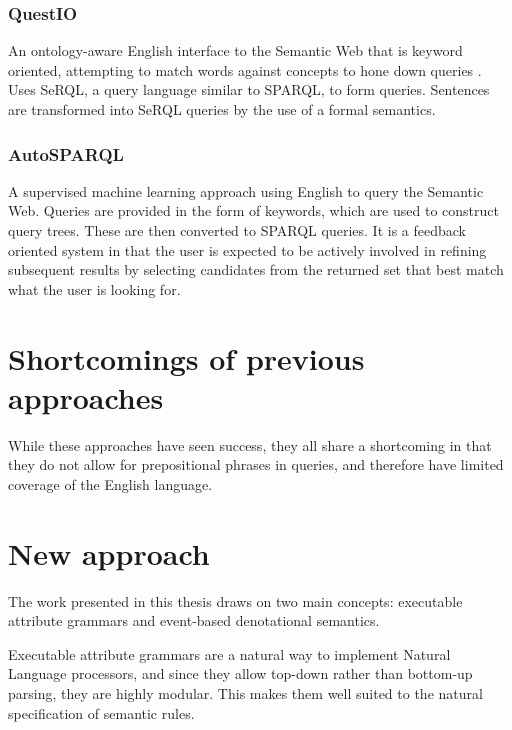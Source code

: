 \documentclass[../main.tex]{subfiles}
\begin{document}
\subsubsection{QuestIO}
An ontology-aware English interface to the Semantic Web that is keyword oriented, attempting to match words against concepts to hone down queries\cite{tablan2008natural} .  Uses SeRQL\cite{serql}, a query language similar to SPARQL, to form queries.  Sentences are transformed into SeRQL queries by the use of a formal semantics.

\subsubsection{AutoSPARQL}
A supervised machine learning approach using English to query the Semantic Web\cite{lehmann2011autosparql}.  Queries are provided in the form of keywords, which are used to construct query trees.  These are then converted to SPARQL queries.  It is a feedback oriented system in that the user is expected to be actively involved in refining subsequent results by selecting candidates from the returned set that best match what the user is looking for.


\section {Shortcomings of previous approaches}

While these approaches have seen success, they all share a shortcoming in that they do not allow for prepositional phrases in queries, and therefore have limited coverage of the English language.

\section {New approach}

The work presented in this thesis draws on two main concepts: executable attribute grammars\cite{frosthafiz2008} and event-based denotational semantics\cite{frostagboola2014}.

Executable attribute grammars are a natural way to implement Natural Language processors\cite{frost1992constructing}, and since they allow top-down rather than bottom-up parsing, they are highly modular\cite{frosthafiz2008}.  This makes them well suited to the natural specification of semantic rules.
\end{document}
